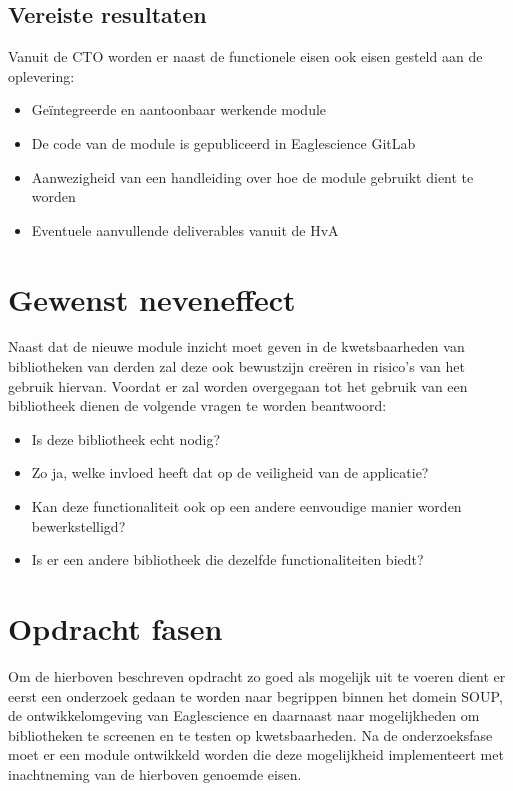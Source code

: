 \subsection{Vereiste resultaten}\label{subsec:deliverables-vereiste-resultaten}
Vanuit de CTO worden er naast de functionele eisen ook eisen gesteld aan de oplevering:
\begin{itemize}
\item Geïntegreerde en aantoonbaar werkende module
\item De code van de module is gepubliceerd in Eaglescience GitLab
\item Aanwezigheid van een handleiding over hoe de module gebruikt dient te worden
\item Eventuele aanvullende deliverables vanuit de HvA
\end{itemize}

\section{Gewenst neveneffect}\label{sec:gewenst-neveneffect}
Naast dat de nieuwe module inzicht moet geven in de kwetsbaarheden van bibliotheken van derden zal deze ook bewustzijn creëren in risico's van het gebruik hiervan. Voordat er zal worden overgegaan tot het gebruik van een bibliotheek dienen de volgende vragen te worden beantwoord:
\begin{itemize}
	\item Is deze bibliotheek echt nodig?
	\item Zo ja, welke invloed heeft dat op de veiligheid van de applicatie?
	\item Kan deze functionaliteit ook op een andere eenvoudige manier worden bewerkstelligd?
	\item Is er een andere bibliotheek die dezelfde functionaliteiten biedt?

\end{itemize}


\section{Opdracht fasen}\label{sec:opdracht-fasen}
Om de hierboven beschreven opdracht zo goed als mogelijk uit te voeren dient er eerst een onderzoek gedaan te worden naar begrippen binnen het domein SOUP, de ontwikkelomgeving van Eaglescience en daarnaast naar mogelijkheden om bibliotheken te screenen en te testen op kwetsbaarheden. Na de onderzoeksfase moet er een module ontwikkeld worden die deze mogelijkheid implementeert met inachtneming van de hierboven genoemde eisen.

